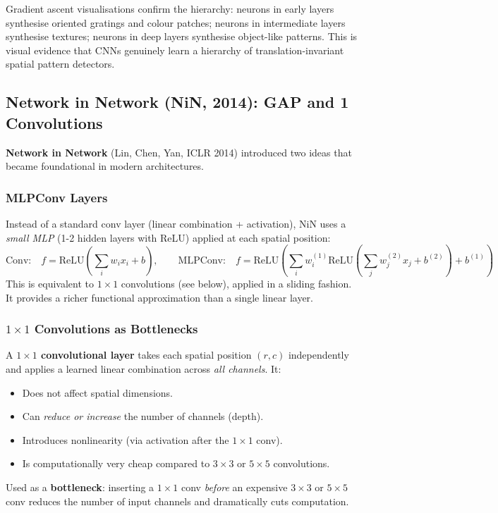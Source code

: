 \documentclass[11pt,a4paper]{article}
\newcommand{\term}[1]{\textcolor{DefGreen}{\textbf{#1}}}
\begin{document}
\begin{insightbox}
Gradient ascent visualisations confirm the hierarchy: neurons in early layers synthesise oriented gratings and colour patches; neurons in intermediate layers synthesise textures; neurons in deep layers synthesise object-like patterns. This is visual evidence that CNNs genuinely learn a hierarchy of translation-invariant spatial pattern detectors.
\end{insightbox}

\subsection{Network in Network (NiN, 2014): GAP and 1 Convolutions}
\label{sec:nin}

\term{Network in Network} (Lin, Chen, Yan, ICLR 2014) introduced two ideas that became foundational in modern architectures.

\subsubsection{MLPConv Layers}

Instead of a standard conv layer (linear combination + activation), NiN uses a \emph{small MLP} (1-2 hidden layers with ReLU) applied at each spatial position:
\[
\text{Conv:} \quad f = \mathrm{ReLU}\!\left(\sum_i w_i x_i + b\right), \qquad
\text{MLPConv:} \quad f = \mathrm{ReLU}\!\left(\sum_i w_i^{(1)}\mathrm{ReLU}\!\left(\sum_j w_j^{(2)} x_j + b^{(2)}\right) + b^{(1)}\right)
\]
This is equivalent to $1\times1$ convolutions (see below), applied in a sliding fashion. It provides a richer functional approximation than a single linear layer.

\subsubsection{$1\times1$ Convolutions as Bottlenecks}

A \textbf{$1\times1$ convolutional layer} takes each spatial position $(r,c)$ independently and applies a learned linear combination across \emph{all channels}. It:
\begin{itemize}
  \item Does not affect spatial dimensions.
  \item Can \emph{reduce or increase} the number of channels (depth).
  \item Introduces nonlinearity (via activation after the $1\times1$ conv).
  \item Is computationally very cheap compared to $3\times3$ or $5\times5$ convolutions.
\end{itemize}
Used as a \term{bottleneck}: inserting a $1\times1$ conv \emph{before} an expensive $3\times3$ or $5\times5$ conv reduces the number of input channels and dramatically cuts computation.
\end{document}
